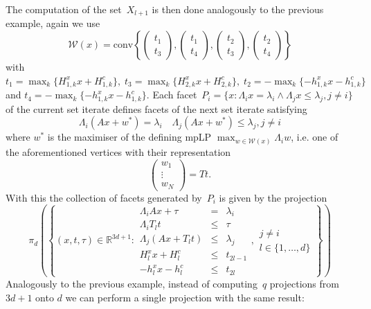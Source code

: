 \documentclass[final]{elsarticle}
\providecommand{\conv}{\text{conv}}
\theoremstyle{remark}
\theoremstyle{definition}
\begin{document}
The computation of the set~$X_{l+1}$ is then done analogously to the previous example, again we use 
%
$$
  \mathcal W(x) = \conv\left\{\begin{pmatrix}t_1\\ t_3\end{pmatrix},\begin{pmatrix}t_1\\ t_4\end{pmatrix},
  \begin{pmatrix} t_2\\ t_3\end{pmatrix},\begin{pmatrix}t_2\\ t_4\end{pmatrix}
  \right\}
$$
%
with $t_1=\max_k\{H_{1,k}^x x+H_{1,k}^c\},\; t_3=\max_k\{H_{2,k}^x x+H_{2,k}^c\},\; t_2=-\max_k\{-h_{1,k}^x x-h_{1,k}^c\}$ and $t_4=-\max_k\{-h_{1,k}^x x-h_{1,k}^c\}$.
%
Each facet~$P_i=\{x:\Lambda_i x=\lambda_i\wedge\Lambda_jx\leq\lambda_j,j\neq i\}$ of the current set iterate defines facets of the next set iterate satisfying
%
\begin{equation}
\Lambda_i(Ax+w^\ast)=\lambda_i\quad \Lambda_j(Ax+w^\ast)\leq\lambda_j,j\neq i
\end{equation}
%
where $w^\ast$ is the maximiser of the defining mpLP $\max_{w\in\mathcal W(x)}\Lambda_iw$, i.e. one of the aforementioned vertices with their representation
%
$$
  \begin{pmatrix} w_1\\ \vdots \\ w_N\end{pmatrix}= Tt.
$$
%
With this the collection of facets generated by~$P_i$ is given by the projection
%
\begin{equation}
  \pi_d\left(\left\{(x,t,\tau)\in\mathbb R^{3d+1}:\begin{array}{rcl}
  \Lambda_iAx+\tau&=&\lambda_i\\
  \Lambda_i T_lt&\leq&\tau\\
  \Lambda_j(Ax+T_lt)&\leq&\lambda_j\\
  H_l^x x + H_l^c&\leq&t_{2l-1}\\
  -h_l^x x - h_l^c&\leq&t_{2l}
  \end{array}, \begin{array}{l}
  j\neq i\\
  l\in\{1,\dots,d\}\end{array}
  \right\}\right)
\end{equation}
%
Analogously to the previous example, instead of computing~$q$ projections from $3d+1$ onto $d$ we can perform a single projection with the same result:
\end{document}

